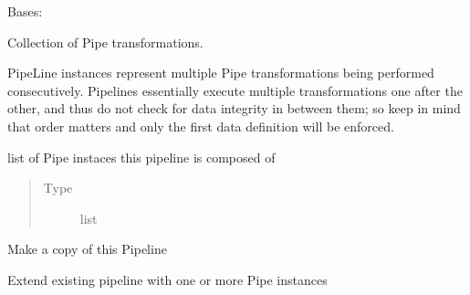 \documentclass[letterpaper,10pt,english]{sphinxmanual}
\begin{document}
\begin{fulllineitems}
\label{\detokenize{dalio.pipe:dalio.pipe.pipe.PipeLine}}
Bases: {\hyperref[\detokenize{dalio.pipe:dalio.pipe.pipe.Pipe}]{}}

Collection of Pipe transformations.

PipeLine instances represent multiple Pipe transformations being
performed consecutively. Pipelines essentially execute multiple
transformations one after the other, and thus do not check for data
integrity in between them; so keep in mind that order matters and only
the first data definition will be enforced.

\begin{fulllineitems}
\label{\detokenize{dalio.pipe:dalio.pipe.pipe.PipeLine.pipeline}}
list of Pipe instaces this pipeline is composed of
\begin{quote}\begin{description}
\item[{Type}] \leavevmode
list

\end{description}\end{quote}

\end{fulllineitems}


\begin{fulllineitems}
\label{\detokenize{dalio.pipe:dalio.pipe.pipe.PipeLine.copy}}
Make a copy of this Pipeline

\end{fulllineitems}


\begin{fulllineitems}
\label{\detokenize{dalio.pipe:dalio.pipe.pipe.PipeLine.extend}}
Extend existing pipeline with one or more Pipe instances


\end{fulllineitems}
\end{fulllineitems}
\end{document}
